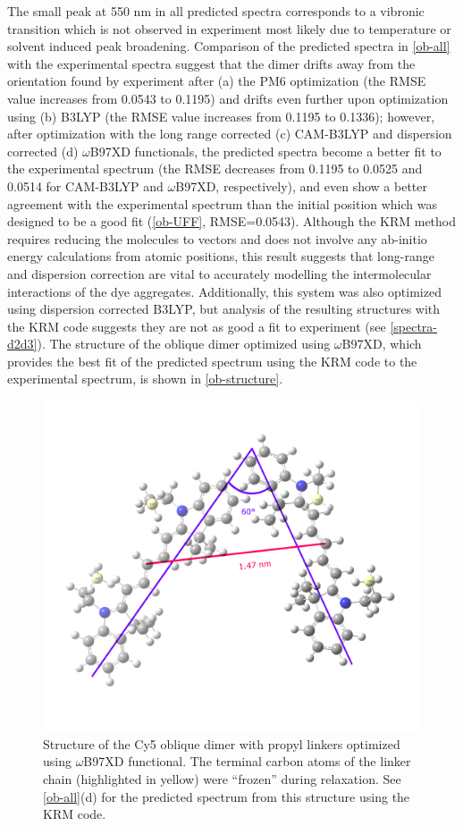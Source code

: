 The small peak at 550 nm in all predicted spectra corresponds to a vibronic transition which is not observed in experiment most likely due to temperature or solvent induced peak broadening. Comparison of the predicted spectra in \autoref{ob-all} with the experimental spectra suggest that the dimer drifts away from the orientation found by experiment after (a) the PM6 optimization (the RMSE value increases from 0.0543 to 0.1195) and drifts even further upon optimization using (b) B3LYP (the RMSE value increases from 0.1195 to 0.1336); however, after optimization with the long range corrected (c) CAM-B3LYP and dispersion corrected (d) $\omega$B97XD functionals, the predicted spectra become a better fit to the experimental spectrum (the RMSE decreases from 0.1195 to 0.0525 and 0.0514 for CAM-B3LYP and $\omega$B97XD, respectively), and even show a better agreement with the experimental spectrum than the initial position which was designed to be a good fit (\autoref{ob-UFF}, RMSE=0.0543). Although the KRM method requires reducing the molecules to vectors and does not involve any ab-initio energy calculations from atomic positions, this result suggests that long-range and dispersion correction are vital to accurately modelling the intermolecular interactions of the dye aggregates. Additionally, this system was also optimized using dispersion corrected B3LYP, but analysis of the resulting structures with the KRM code suggests they are not as good a fit to experiment \cite{Grimme2006, Grimme2011} (see \autoref{spectra-d2d3}). The structure of the oblique dimer optimized using $\omega$B97XD, which provides the best fit of the predicted spectrum using the KRM code to the experimental spectrum, is shown in \autoref{ob-structure}.
\begin{figure}[h!]
    \centering
    \includegraphics[width=0.8\linewidth]{figures/pub1/obdimer3-top.pdf}
    \caption{Structure of the Cy5 oblique dimer with propyl linkers optimized using $\omega$B97XD functional. The terminal carbon atoms of the linker chain (highlighted in yellow) were “frozen” during relaxation. See \autoref{ob-all}(d) for the predicted spectrum from this structure using the KRM code.}\label{ob-structure}
\end{figure}


